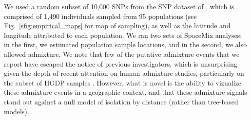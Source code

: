 \documentclass[12pt]{article}
\begin{document}
We used a random subset of 10,000 SNPs from the SNP dataset of \citet{Hellenthal}, which is comprised of 1,490 individuals sampled from 95 populations (see Fig.\ \ref{sfig:empirical_maps} for map of sampling), as well as the latitude and longitude attributed to each population.  We ran two sets of SpaceMix analyses: in the first, we estimated population sample locations, and in the second, we 
also allowed admixture. We note that few of the putative admixture events that we report have escaped the notice of previous investigators, which is unsurprising given the depth of recent attention on human admixture studies, particularly on the subset of HGDP samples \citep[see ][for various global analyses]{rosenberg_genetic_2002,li_worldwide_2008,Loh:13,patterson_ancient_2012,Hellenthal}. However, what is novel is the ability to vizualize these admixture events in a geographic context, and that these admixture signals stand out against a null model of isolation by distance (rather than tree-based models).

\end{document}
